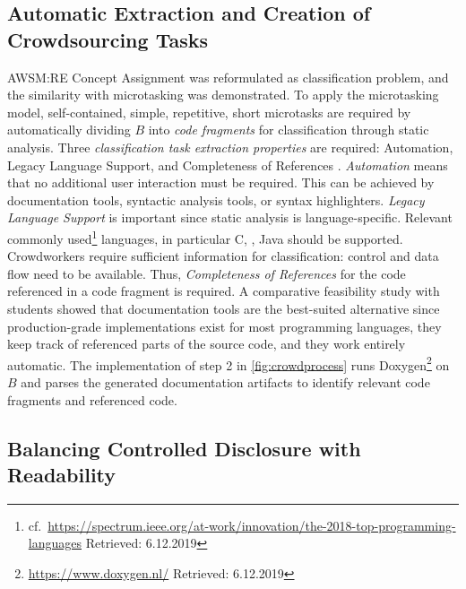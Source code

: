 \vspace{-10pt}
\subsection[Automatic Crowdsourcing Task Extraction \\ \& Creation]{Automatic Extraction and Creation of Crowdsourcing Tasks}
\vspace{10pt}

AWSM:RE \gls{Concept Assignment} was reformulated as classification problem, and the similarity with microtasking was demonstrated.
To apply the microtasking model, self-contained, simple, repetitive, short microtasks are required by automatically dividing \(B\) into \emph{code fragments} for classification through static analysis.
Three \emph{classification task extraction properties} are required: Automation, Legacy Language Support, and Completeness of References \autocite{Heil2018CSRE,Heil2019CSRECCIS}.
\emph{Automation} means that no additional user interaction must be required.
This can be achieved by documentation tools, syntactic analysis tools, or syntax highlighters.
\emph{Legacy Language Support} is important since static analysis is language-specific.
Relevant commonly used\footnote{cf.~\url{https://spectrum.ieee.org/at-work/innovation/the-2018-top-programming-languages} Retrieved: 6.12.2019}  languages, in particular C, \cpp, Java should be supported.
Crowdworkers require sufficient information for classification: control and data flow need to be available.
Thus, \emph{Completeness of References} for the code referenced in a code fragment is required.
A comparative feasibility study with students showed that documentation tools are the best-suited alternative since production-grade implementations exist for most programming languages, they keep track of referenced parts of the source code, and they work entirely automatic.
The implementation of step 2 in \cref{fig:crowdprocess} runs Doxygen\footnote{\url{https://www.doxygen.nl/} Retrieved: 6.12.2019} on \(B\) and parses the generated documentation \glspl{artifact} to identify relevant code fragments and referenced code.

\vspace{-10pt}
\hypertarget{sec:csre.anonym}{%
\subsection{Balancing Controlled Disclosure with Readability}\label{sec:csre.anonym}}
\vspace{10pt}

